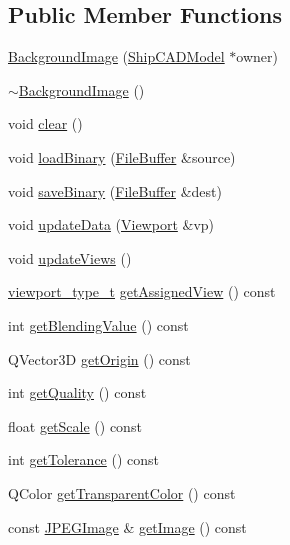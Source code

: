\subsection*{Public Member Functions}
\begin{DoxyCompactItemize}
\item 
\hyperlink{classShipCAD_1_1BackgroundImage_a9ee3fc5f44c47b757f23baaeacd78553}{Background\+Image} (\hyperlink{classShipCAD_1_1ShipCADModel}{Ship\+C\+A\+D\+Model} $\ast$owner)
\item 
\hyperlink{classShipCAD_1_1BackgroundImage_ac36cf427a30ec243f55a2808488a3c7e}{$\sim$\+Background\+Image} ()
\item 
void \hyperlink{classShipCAD_1_1BackgroundImage_a9c25ab668820b7ba0ab59a061c28d2a0}{clear} ()
\item 
void \hyperlink{classShipCAD_1_1BackgroundImage_a72abed6b5cdbd287ec41c817acf84de9}{load\+Binary} (\hyperlink{classShipCAD_1_1FileBuffer}{File\+Buffer} \&source)
\item 
void \hyperlink{classShipCAD_1_1BackgroundImage_a5b6df7f94af9d32579888394b2f86f40}{save\+Binary} (\hyperlink{classShipCAD_1_1FileBuffer}{File\+Buffer} \&dest)
\item 
void \hyperlink{classShipCAD_1_1BackgroundImage_aebee3507d92cb5d6ca486c15313e0beb}{update\+Data} (\hyperlink{classShipCAD_1_1Viewport}{Viewport} \&vp)
\item 
void \hyperlink{classShipCAD_1_1BackgroundImage_a47bb9eeb69dbe6062392749ecaef2eb7}{update\+Views} ()
\item 
\hyperlink{namespaceShipCAD_aeeeb05810f2e31ef89fd4ac6b6ba9c0a}{viewport\+\_\+type\+\_\+t} \hyperlink{classShipCAD_1_1BackgroundImage_a4ed6b7b2a8a9d647c82a1e0c1fc52b9e}{get\+Assigned\+View} () const 
\item 
int \hyperlink{classShipCAD_1_1BackgroundImage_a85d654832400b02adeab512df7ef969c}{get\+Blending\+Value} () const 
\item 
Q\+Vector3D \hyperlink{classShipCAD_1_1BackgroundImage_a886fe351723011ea9ba85ccf055412d0}{get\+Origin} () const 
\item 
int \hyperlink{classShipCAD_1_1BackgroundImage_ad2f1eaa1a63c102b137f9aa7e2750a66}{get\+Quality} () const 
\item 
float \hyperlink{classShipCAD_1_1BackgroundImage_a66ebc90fd74efd91c77d27434031044d}{get\+Scale} () const 
\item 
int \hyperlink{classShipCAD_1_1BackgroundImage_a1435bf5a160f1ed1a0fd96debac70a87}{get\+Tolerance} () const 
\item 
Q\+Color \hyperlink{classShipCAD_1_1BackgroundImage_a62aae7fd8eb0551f214d483c7e52f30f}{get\+Transparent\+Color} () const 
\item 
const \hyperlink{structShipCAD_1_1JPEGImage}{J\+P\+E\+G\+Image} \& \hyperlink{classShipCAD_1_1BackgroundImage_a758e87c8ab9c85cfde9662ebc10831ce}{get\+Image} () const 
\end{DoxyCompactItemize}


